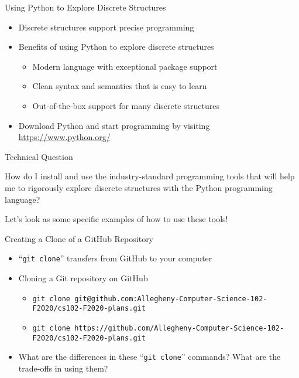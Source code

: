 \documentclass[14pt,aspectratio=169]{beamer}
\begin{document}
%
\begin{frame}{Using Python to Explore Discrete Structures}
  \begin{itemize}
    \item Discrete structures support precise programming
    \item Benefits of using Python to explore discrete structures
      \begin{itemize}
        \item Modern language with exceptional package support
        \item Clean syntax and semantics that is easy to learn
        \item Out-of-the-box support for many discrete structures
      \end{itemize}
    \item Download Python and start programming by visiting
      \url{https://www.python.org/}
  \end{itemize}
\end{frame}

%
\begin{frame}{Technical Question}
  \begin{center}
    {\large How do I install and use the industry-standard programming tools that will
      help me to rigorously explore discrete structures with the Python
    programming language?}
  \end{center}
  \vspace{2ex}
  \begin{center}
    \small Let's look as some specific examples of how to use these tools!
  \end{center}
\end{frame}

%
\begin{frame}{Creating a Clone of a GitHub Repository}
  \setlength{\leftmarginii}{0.5cm}
  \begin{itemize}
    \item ``{\tt git clone}'' transfers from GitHub to your computer
    \item Cloning a Git repository on GitHub
      {\tiny
        \begin{itemize}
          \item {\tt git clone git@github.com:Allegheny-Computer-Science-102-F2020/cs102-F2020-plans.git}
          \item {\tt git clone https://github.com/Allegheny-Computer-Science-102-F2020/cs102-F2020-plans.git}
        \end{itemize}
      }
    \item What are the differences in these ``{\tt git clone}'' commands? What are the trade-offs in using them?
  \end{itemize}
\end{frame}
\end{document}
